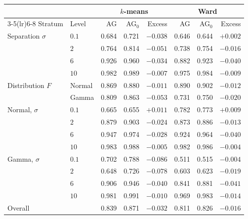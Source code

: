 \begin{tabular}{llrrrrrr}
\toprule
 & & \multicolumn{3}{c}{$k$-means} & \multicolumn{3}{c}{Ward} \\
\cmidrule(lr){3-5}\cmidrule(lr){6-8}
Stratum & Level & AG & AG$_0$ & Excess & AG & AG$_0$ & Excess \\
\midrule
Separation $\sigma$ & $0.1$ & 0.684 & 0.721 & $-0.038$ & 0.646 & 0.644 & $+0.002$ \\
 & $2$ & 0.764 & 0.814 & $-0.051$ & 0.738 & 0.754 & $-0.016$ \\
 & $6$ & 0.926 & 0.960 & $-0.034$ & 0.882 & 0.923 & $-0.040$ \\
 & $10$ & 0.982 & 0.989 & $-0.007$ & 0.975 & 0.984 & $-0.009$ \\
\addlinespace
Distribution $F$ & Normal & 0.869 & 0.880 & $-0.011$ & 0.890 & 0.902 & $-0.012$ \\
 & Gamma & 0.809 & 0.863 & $-0.053$ & 0.731 & 0.750 & $-0.020$ \\
\addlinespace
Normal, $\sigma$ & $0.1$ & 0.665 & 0.655 & $+0.011$ & 0.782 & 0.773 & $+0.009$ \\
 & $2$ & 0.879 & 0.903 & $-0.024$ & 0.873 & 0.886 & $-0.013$ \\
 & $6$ & 0.947 & 0.974 & $-0.028$ & 0.924 & 0.964 & $-0.040$ \\
 & $10$ & 0.983 & 0.988 & $-0.005$ & 0.982 & 0.986 & $-0.004$ \\
\addlinespace
Gamma, $\sigma$ & $0.1$ & 0.702 & 0.788 & $-0.086$ & 0.511 & 0.515 & $-0.004$ \\
 & $2$ & 0.648 & 0.726 & $-0.078$ & 0.603 & 0.623 & $-0.019$ \\
 & $6$ & 0.906 & 0.946 & $-0.040$ & 0.841 & 0.881 & $-0.041$ \\
 & $10$ & 0.981 & 0.991 & $-0.010$ & 0.969 & 0.983 & $-0.014$ \\
\midrule
Overall &  & 0.839 & 0.871 & $-0.032$ & 0.811 & 0.826 & $-0.016$ \\
\bottomrule
\end{tabular}
